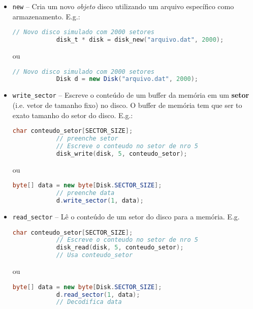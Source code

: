 \documentclass[a4paper, oneside,12pt]{article}
\begin{document}
\begin{itemize}
    \item \texttt{new} -- Cria um novo \emph{objeto} disco utilizando um arquivo específico como armazenamento. E.g.:
        \begin{lstlisting}[language=c]
            // Novo disco simulado com 2000 setores
            disk_t * disk = disk_new("arquivo.dat", 2000);
        \end{lstlisting}

        ou

        \begin{lstlisting}[language=java]
            // Novo disco simulado com 2000 setores
            Disk d = new Disk("arquivo.dat", 2000);
        \end{lstlisting}

    \item \texttt{write\_sector} -- Escreve o conteúdo de um buffer da memória em um \textbf{setor} (i.e. vetor de tamanho fixo) no disco. O buffer de memória tem que ser to exato tamanho do setor do disco. E.g.:

        \begin{lstlisting}[language=c]
            char conteudo_setor[SECTOR_SIZE];
            // preenche setor
            // Escreve o conteudo no setor de nro 5
            disk_write(disk, 5, conteudo_setor);
        \end{lstlisting}

        ou

        \begin{lstlisting}[language=java]
            byte[] data = new byte[Disk.SECTOR_SIZE];
            // preenche data
            d.write_sector(1, data);
        \end{lstlisting}

    \item \texttt{read\_sector} -- Lê o conteúdo de um setor do disco para a memória. E.g.

        \begin{lstlisting}[language=c]
            char conteudo_setor[SECTOR_SIZE];
            // Escreve o conteudo no setor de nro 5
            disk_read(disk, 5, conteudo_setor);
            // Usa conteudo_setor
        \end{lstlisting}

        ou

        \begin{lstlisting}[language=java]
            byte[] data = new byte[Disk.SECTOR_SIZE];
            d.read_sector(1, data);
            // Decodifica data
        \end{lstlisting}

\end{itemize}
\end{document}
